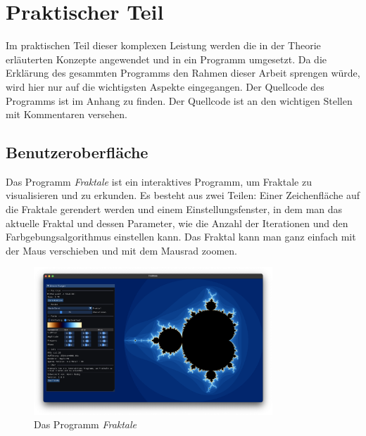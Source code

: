 \chapter{Praktischer Teil}
\thispagestyle{fancy} %
Im praktischen Teil dieser komplexen Leistung werden die in der Theorie erläuterten Konzepte angewendet und in ein Programm umgesetzt. \newline Da die Erklärung des gesammten Programms den Rahmen dieser Arbeit sprengen würde, wird hier nur auf die wichtigsten Aspekte eingegangen. Der Quellcode des Programms ist im Anhang zu finden. Der Quellcode ist an den wichtigen Stellen mit Kommentaren versehen.

\section{Benutzeroberfläche}
Das Programm \textit{Fraktale} ist ein interaktives Programm, um Fraktale zu
visualisieren und zu erkunden. \newline Es besteht aus zwei Teilen: Einer
Zeichenfläche auf die Fraktale gerendert werden und einem Einstellungsfenster,
in dem man das aktuelle Fraktal und dessen Parameter, wie die Anzahl der
Iterationen und den Farbgebungsalgorithmus einstellen kann. Das Fraktal kann
man ganz einfach mit der Maus verschieben und mit dem Mausrad zoomen.

\begin{figure}[H]
    \centering
    \includegraphics[width=0.8\textwidth]{img/Programm.png}
    \caption{Das Programm \textit{Fraktale}}
\end{figure}

